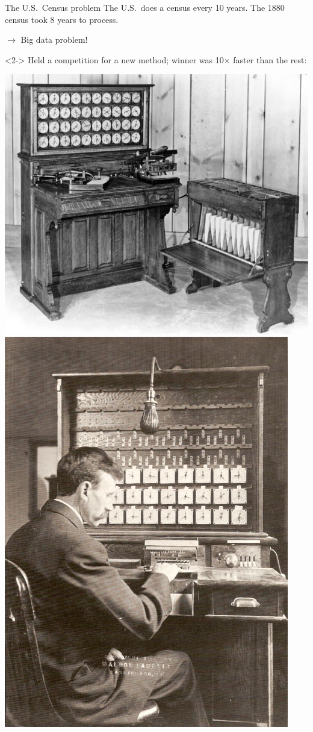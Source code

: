 \documentclass[aspectratio=169]{beamer}
\begin{document}
\begin{frame}{The U.S.\ Census problem}
\large
\vspace{0.35 cm}
The U.S.\ does a census every 10 years. The 1880 census took 8 years to process.
\begin{center}
$\longrightarrow$ Big data problem!
\end{center}

\vspace{0.15 cm}
\begin{uncoverenv}<2->
Held a competition for a new method; winner was 10$\times$ faster than the rest:

\begin{center}
\includegraphics[height=5.3 cm]{hollerith.jpg}\hspace{1 cm}\includegraphics[height=5.3 cm]{1908_Hollerith_Machine.jpg}
\end{center}
\end{uncoverenv}
\end{frame}
\end{document}
